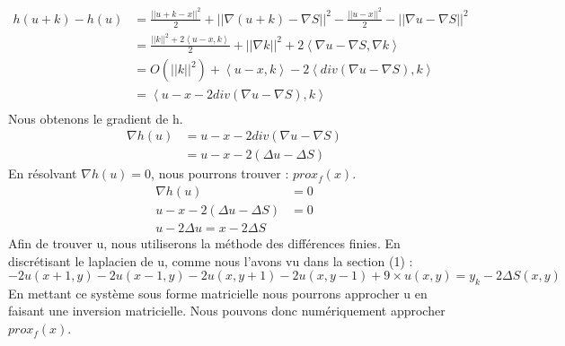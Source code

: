 \begin{equation*}
\begin{aligned}
h(u+k) -h(u) &= \frac{||u+k-x||^2}{2}+||\nabla  (u+k) -\nabla S ||^2- \frac{||u-x||^2}{2}-||\nabla u -\nabla S ||^2\\
& = \frac{||k||^2+2\left<u-x,k\right>}{2}+||\nabla k||^2+2\left<\nabla u-\nabla S, \nabla k\right>\\
& = O(||k||^2)+\left<u-x,k\right>-2\left<div(\nabla u-\nabla S), k\right>\\
& = \left<u-x-2div(\nabla u-\nabla S), k\right>\\
\end{aligned}
\end{equation*}
Nous obtenons le gradient de h.
\begin{equation*}
\begin{aligned}
\nabla h(u) &= u-x-2div(\nabla u - \nabla S)\\
& = u-x-2(\Delta u -\Delta S)
\end{aligned}
\end{equation*}
En résolvant $\nabla h(u) = 0$, nous pourrons trouver  : $prox_f(x) $. \\	
	\begin{equation*}
		\begin{aligned}
		\nabla h(u) &= 0\\
		u-x-2(\Delta u -\Delta S) & =0\\
		u-2\Delta u = x-2\Delta S
		\end{aligned}
\end{equation*}
Afin de trouver u, nous utiliserons la méthode des différences finies. En discrétisant le laplacien de u, comme nous l'avons vu dans la section (1) : 
\begin{equation*}
 -2u(x+1,y) -2 u(x-1,y)-2u(x,y+1) -2 u(x,y-1) +9\times u(x,y) =  y_k-  2\Delta S(x,y)
\end{equation*}
En mettant ce système sous forme matricielle nous pourrons approcher u en faisant une inversion matricielle. 
Nous pouvons donc numériquement approcher $prox_f(x)$.

